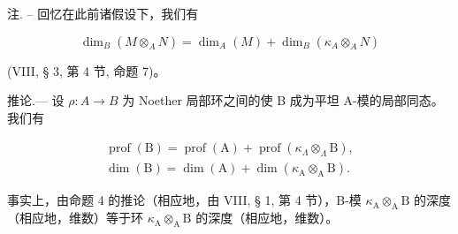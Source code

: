 注. -- 回忆在此前诸假设下，我们有

\[
\dim_ {B} (M \otimes_ {A} N) = \dim_ {A} (M) + \dim_ {B} (\kappa_ {A} \otimes_ {A} N)
\]

(VIII, § 3, 第 4 节, 命题 7)。

推论.--- 设 \(\rho: A \to B\) 为 Noether 局部环之间的使 B 成为平坦 A-模的局部同态。我们有

\[
\begin{array}{l} \operatorname{prof} (\mathrm{B}) = \operatorname{prof} (\mathrm{A}) + \operatorname{prof} \left(\kappa_ {\Lambda} \otimes_ {\Lambda} \mathrm{B}\right), \\ \dim (\mathrm{B}) = \dim (\mathrm{A}) + \dim \left(\kappa_ {\mathrm{A}} \otimes_ {\mathrm{A}} \mathrm{B}\right). \end{array}
\]

事实上，由命题 4 的推论（相应地，由 VIII, § 1, 第 4 节），B-模 \(\kappa_{\mathrm{A}}\otimes_{\mathrm{A}}\mathrm{B}\) 的深度（相应地，维数）等于环 \(\kappa_{\mathrm{A}}\otimes_{\mathrm{A}}\mathrm{B}\) 的深度（相应地，维数）。

